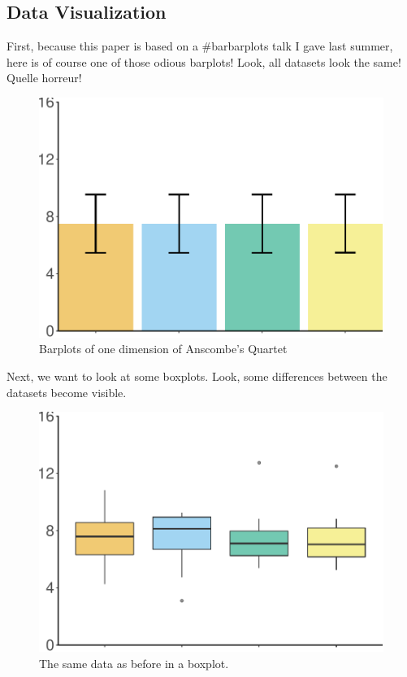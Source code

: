 \documentclass[english,floatsintext,man]{apa6}
\begin{document}
\subsection{Data Visualization}\label{data-visualization}

First, because this paper is based on a \#barbarplots talk I gave last
summer, here is of course one of those odious barplots! Look, all
datasets look the same! Quelle horreur!

\begin{figure}[htbp]
\centering
\includegraphics{APA_Untidy_Paper_files/figure-latex/unnamed-chunk-1-1.pdf}
\caption{\label{fig:unnamed-chunk-1}Barplots of one dimension of Anscombe's
Quartet}
\end{figure}

Next, we want to look at some boxplots. Look, some differences between
the datasets become visible.

\begin{figure}[htbp]
\centering
\includegraphics{APA_Untidy_Paper_files/figure-latex/unnamed-chunk-2-1.pdf}
\caption{\label{fig:unnamed-chunk-2}The same data as before in a boxplot.}
\end{figure}
\end{document}
